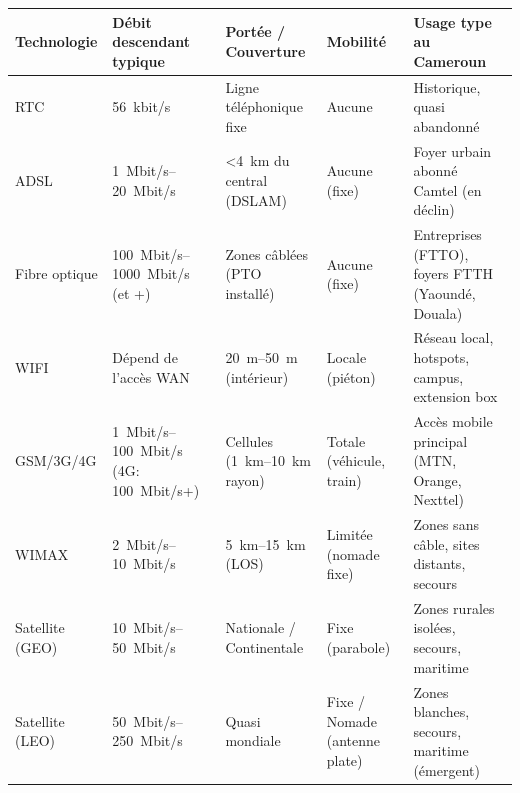 \documentclass[11pt]{article}
\begin{document}
\begin{center}
\begin{tabularx}{\linewidth}{|l|l|l|l|X|}
\hline
\rowcolor{popblueL} \textbf{Technologie} & \textbf{Débit descendant typique} & \textbf{Portée / Couverture} & \textbf{Mobilité} & \textbf{Usage type au Cameroun} \\
\hline
RTC & \SI{56}{kbit/s} & Ligne téléphonique fixe & Aucune & Historique, quasi abandonné \\
\hline
ADSL & \SIrange{1}{20}{Mbit/s} & \textless \SI{4}{km} du central (DSLAM) & Aucune (fixe) & Foyer urbain abonné Camtel (en déclin) \\
\hline
Fibre optique & \SIrange{100}{1000}{Mbit/s} (et +) & Zones câblées (PTO installé) & Aucune (fixe) & Entreprises (FTTO), foyers FTTH (Yaoundé, Douala) \\
\hline
WIFI & Dépend de l'accès WAN & \SIrange{20}{50}{m} (intérieur) & Locale (piéton) & Réseau local, hotspots, campus, extension box \\
\hline
GSM/3G/4G & \SIrange{1}{100}{Mbit/s} (4G: \SI{100}{Mbit/s}+) & Cellules (\SIrange{1}{10}{km} rayon) & Totale (véhicule, train) & Accès mobile principal (MTN, Orange, Nexttel) \\
\hline
WIMAX & \SIrange{2}{10}{Mbit/s} & \SIrange{5}{15}{km} (LOS) & Limitée (nomade fixe) & Zones sans câble, sites distants, secours \\
\hline
Satellite (GEO) & \SIrange{10}{50}{Mbit/s} & Nationale / Continentale & Fixe (parabole) & Zones rurales isolées, secours, maritime \\
\hline
Satellite (LEO) & \SIrange{50}{250}{Mbit/s} & Quasi mondiale & Fixe / Nomade (antenne plate) & Zones blanches, secours, maritime (émergent) \\
\hline
\end{tabularx}
\end{center}
\end{document}
